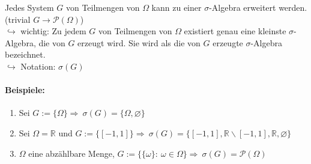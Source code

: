 \documentclass[12pt,a4paper]{article}
\begin{document}
	Jedes System $G$ von Teilmengen von $\Omega$ kann zu einer $\sigma$-Algebra erweitert werden. (trivial $G\rightarrow\mathcal{P}(\Omega)$)\\
	$\hookrightarrow$ wichtig: Zu jedem $G$ von Teilmengen von $\Omega$ existiert genau eine kleinste $\sigma$-Algebra, die von $G$ erzeugt wird.	Sie wird als die von $G$ erzeugte $\sigma$-Algebra bezeichnet. \\
	$\hookrightarrow$ Notation: $\sigma(G)$
	
	\paragraph{Beispiele:}
	\begin{enumerate}
		\item Sei $G:=\{\Omega\}\Rightarrow \: \sigma(G)=\{\Omega,\varnothing\}$
		\item Sei $\Omega=\mathbb{R}$ und $G:=\{[-1,1]\}\Rightarrow\: \sigma(G)=\{[-1,1],\mathbb{R}\backslash [-1,1],\mathbb{R},\varnothing\}$
		\item $\Omega$ eine abzählbare Menge, $G:=\{\{\omega\}:\: \omega\in\Omega\}\Rightarrow \: \sigma(G)=\mathcal{P}(\Omega)$
	\end{enumerate}
	
	
	
\end{document}
